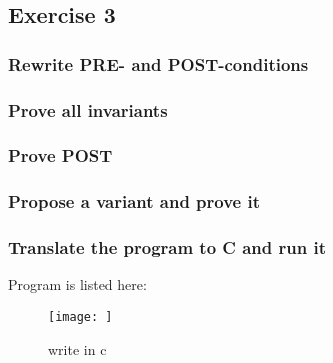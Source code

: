 \documentclass[11pt,a4paper,fleqn]{article}
\begin{document}
\subsection{Exercise 3}

\subsubsection{Rewrite PRE- and POST-conditions}


\subsubsection{Prove all invariants}

\subsubsection{Prove POST}

\subsubsection{Propose a variant and prove it}

\subsubsection{Translate the program to C and run it}
Program is listed here:\\

\begin{figure}[h!]
\centering
\texttt{[image: ]}
\caption{ write in c}
\label{fig}
\end{figure}



%
%
\end{document}

